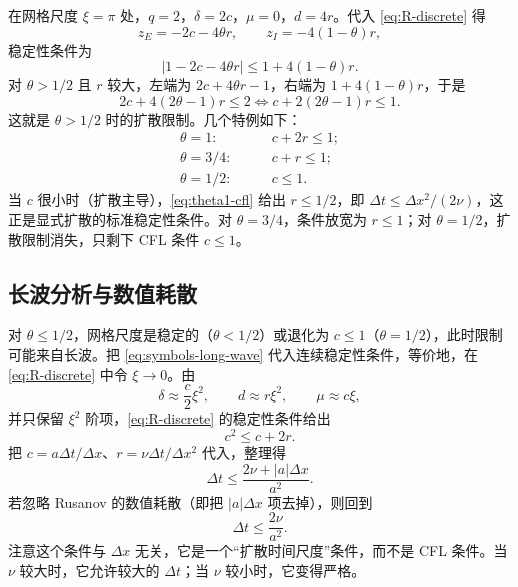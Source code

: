 在网格尺度 $\xi=\pi$ 处，$q=2$，$\delta=2c$，$\mu=0$，$d=4r$。代入 \eqref{eq:R-discrete} 得
\begin{equation}
  z_E=-2c-4\theta r,\qquad z_I=-4(1-\theta)r,
  \label{eq:sawtooth}
\end{equation}
稳定性条件为
\begin{equation}
  \left|1-2c-4\theta r\right|\le1+4(1-\theta)r.
  \label{eq:sawtooth-ineq}
\end{equation}
对 $\theta>1/2$ 且 $r$ 较大，左端为 $2c+4\theta r-1$，右端为 $1+4(1-\theta)r$，于是
\begin{equation}
  2c+4(2\theta-1)r\le2
  \iff
  c+2(2\theta-1)r\le1.
  \label{eq:sawtooth-condition}
\end{equation}
这就是 $\theta>1/2$ 时的扩散限制。几个特例如下：
\begin{align}
  \theta=1:&\qquad c+2r\le1; \label{eq:theta1-cfl}\\
  \theta=3/4:&\qquad c+r\le1; \label{eq:theta34-cfl}\\
  \theta=1/2:&\qquad c\le1. \label{eq:theta12-cfl}
\end{align}
当 $c$ 很小时（扩散主导），\eqref{eq:theta1-cfl} 给出 $r\le1/2$，即 $\Delta t\le\Delta x^2/(2\nu)$，这正是显式扩散的标准稳定性条件。对 $\theta=3/4$，条件放宽为 $r\le1$；对 $\theta=1/2$，扩散限制消失，只剩下 CFL 条件 $c\le1$。

\subsection{长波分析与数值耗散}

对 $\theta\le1/2$，网格尺度是稳定的（$\theta<1/2$）或退化为 $c\le1$（$\theta=1/2$），此时限制可能来自长波。把 \eqref{eq:symbols-long-wave} 代入连续稳定性条件，等价地，在 \eqref{eq:R-discrete} 中令 $\xi\to0$。由
\begin{equation}
  \delta\approx\frac{c}{2}\xi^2,\qquad
  d\approx r\xi^2,\qquad
  \mu\approx c\xi,
\end{equation}
并只保留 $\xi^2$ 阶项，\eqref{eq:R-discrete} 的稳定性条件给出
\begin{equation}
  c^2\le c+2r.
  \label{eq:long-wave-c-r}
\end{equation}
把 $c=a\Delta t/\Delta x$、$r=\nu\Delta t/\Delta x^2$ 代入，整理得
\begin{equation}
  \Delta t\le\frac{2\nu+|a|\Delta x}{a^2}.
  \label{eq:low-k-numerical}
\end{equation}
若忽略 Rusanov 的数值耗散（即把 $|a|\Delta x$ 项去掉），则回到
\begin{equation}
  \Delta t\le\frac{2\nu}{a^2}.
  \label{eq:low-k-condition}
\end{equation}
注意这个条件与 $\Delta x$ 无关，它是一个“扩散时间尺度”条件，而不是 CFL 条件。当 $\nu$ 较大时，它允许较大的 $\Delta t$；当 $\nu$ 较小时，它变得严格。

